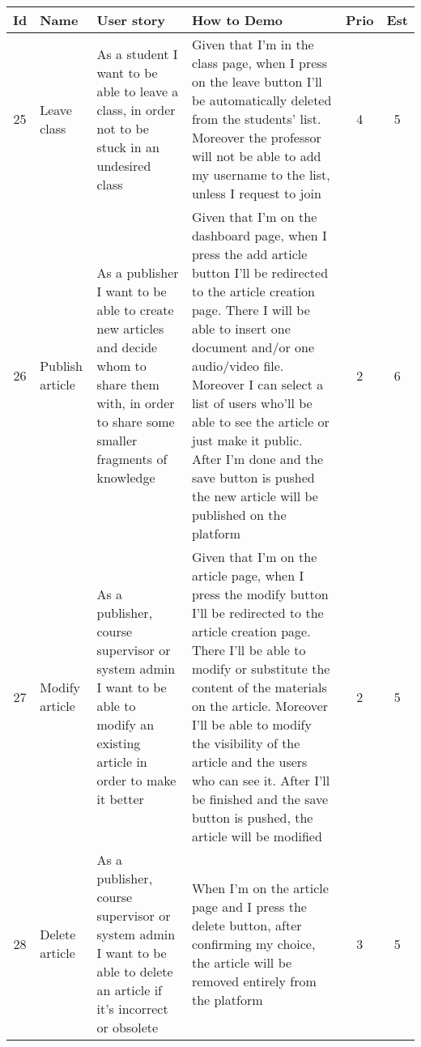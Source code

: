 \begin{tabular}{|c|m{1.5cm}|m{4cm}|m{4cm}|c|c|}
	\hline
	\textbf{Id}&\textbf{Name}&\textbf{User story}&\textbf{How to Demo}&\textbf{Prio}&\textbf{Est}\\
	\hline
	25 & Leave class & 
	As a student I want to be able to leave a class, in order not to be stuck in an undesired class & 
	Given that I'm in the class page, when I press on the leave button I'll be automatically deleted from the students' list. Moreover the professor will not be able to add my username to the list, unless I request to join &
	4 & 5 \\
	\hline
	26 & Publish article & 
	As a publisher I want to be able to create new articles and decide whom to share them with, in order to share some smaller fragments of knowledge & 
	Given that I'm on the dashboard page, when I press the add article button I'll be redirected to the article creation page. There I will be able to insert one document and/or one audio/video file. Moreover I can select a list of users who'll be able to see the article or just make it public. After I'm done and the save button is pushed the new article will be published on the platform &
	2 & 6 \\
	\hline
	27 & Modify article & 
	As a publisher, course supervisor or system admin I want to be able to modify an existing article in order to make it better & 
	Given that I'm on the article page, when I press the modify button I'll be redirected to the article creation page. There I'll be able to modify or substitute the content of the materials on the article. Moreover I'll be able to modify the visibility of the article and the users who can see it. After I’ll be finished and the save button is pushed, the article will be modified &
	2 & 5 \\
	\hline
	28 & Delete article & 
	As a publisher, course supervisor or system admin I want to be able to delete an article if it's incorrect or obsolete & 
	When I'm on the article page and I press the delete button, after confirming my choice, the article will be removed entirely from the platform &
	3 & 5 \\
	\hline
\end{tabular}    
